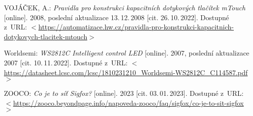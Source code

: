 \begin{thebibliography}{99}
    VOJÁČEK, A.:
    \emph{Pravidla pro konstrukci kapacitních dotykových tlačítek mTouch}\/ [online].
    2008, poslední aktualizace 13.\,12.\,2008 [cit. 26.\,10.\,2022].
    Dostupné z~URL:
    \(<\)\url{https://automatizace.hw.cz/pravidla-pro-konstrukci-kapacitnich-dotykovych-tlacitek-mtouch}\(>\)

    Worldsemi:
    \emph{WS2812C Intelligent control LED}\/ [online].
    2007, poslední aktualizace 2007 [cit. 10.\,11.\,2022].
    Dostupné z~URL: 
    \(<\)\url{https://datasheet.lcsc.com/lcsc/1810231210_Worldsemi-WS2812C_C114587.pdf}\(>\)

    ZOOCO:
    \emph{Co je to síť Sigfox?}\/ [online].
    2023 [cit. 03.\,01.\,2023].
    Dostupné z~URL: 
    \(<\)\url{https://zooco.beyondpage.info/napoveda-zooco/faq/sigfox/co-je-to-sit-sigfox}\(>\)

\end{thebibliography}


%
%
%
